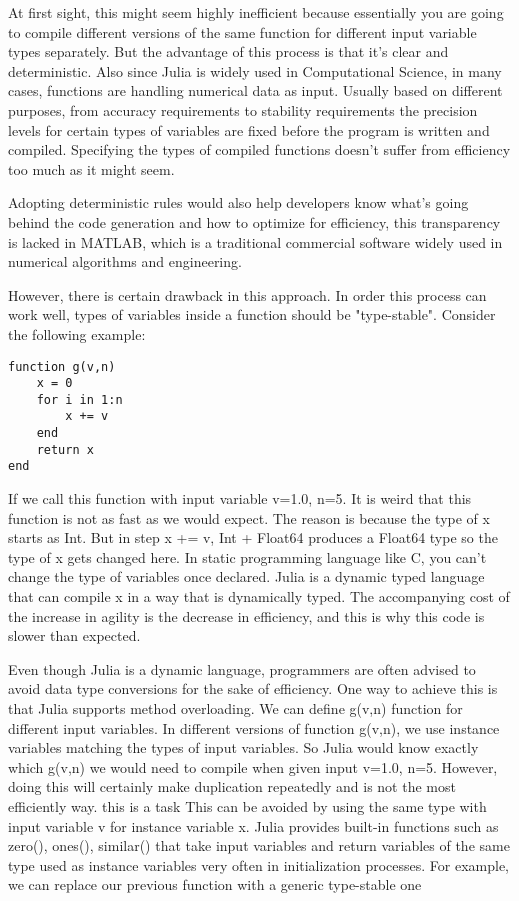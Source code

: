 \documentclass[11pt]{article}
\begin{document}
At first sight, this might seem highly inefficient because essentially you are going to compile different versions of the same function for different input variable types separately. But the advantage of this process is that it's clear and deterministic. Also since Julia is widely used in Computational Science, in many cases, functions are handling numerical data as input. Usually based on different purposes, from accuracy requirements to stability requirements the precision levels for certain types of variables are fixed before the program is written and compiled. Specifying the types of compiled functions doesn't suffer from efficiency too much as it might seem.

Adopting deterministic rules would also help developers know what's going behind the code generation and how to optimize for efficiency, this transparency is lacked in MATLAB, which is a traditional commercial software widely used in numerical algorithms and engineering. 

However, there is certain drawback in this approach. In order this process can work well,  types of variables inside a function should be "type-stable". Consider the following example:

\begin{lstlisting}
function g(v,n) 
    x = 0
    for i in 1:n
        x += v
    end
    return x
end
\end{lstlisting}

If we call this function with input variable v=1.0, n=5. It is weird that this function is not as fast as we would expect. The reason is because the type of x starts as Int. But in step x += v, Int + Float64 produces a Float64 type so the type of x gets changed here. In static programming language like C, you can't change the type of variables once declared. Julia is a dynamic typed language that can compile x in a way that is dynamically typed. The accompanying cost of the increase in agility is the decrease in efficiency, and this is why this code is slower than expected.

Even though Julia is a dynamic language, programmers are often advised to avoid data type conversions for the sake of efficiency. One way to achieve this is that Julia supports method overloading. We can define g(v,n) function for different input variables. In different versions of function g(v,n), we use instance variables matching the types of input variables. So Julia would know exactly which g(v,n) we would need to compile when given input v=1.0, n=5. However, doing this will certainly make duplication repeatedly and is not the most efficiently way. this is a task This can be avoided by using the same type with input variable v for instance variable x. Julia provides built-in functions such as zero(), ones(), similar() that take input variables and return variables of the same type used as instance variables very often in initialization processes. For example, we can replace our previous function with a generic type-stable one
\end{document}
